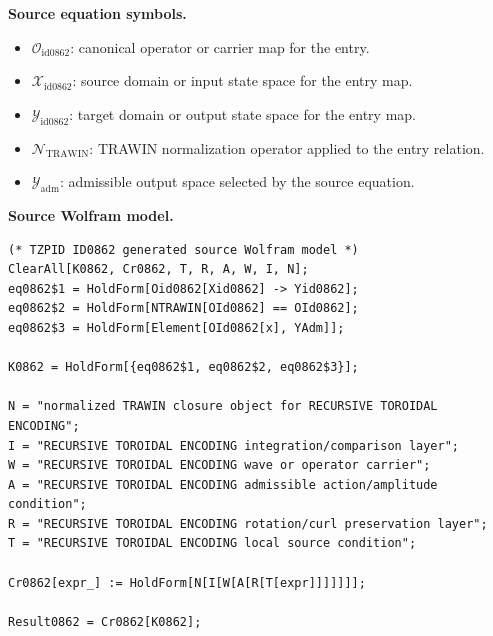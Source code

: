 \begin{minipage}[t]{0.49\linewidth}
\begingroup
\small
\raggedright
\textbf{Source equation symbols.}\par
\begin{itemize}[leftmargin=1.35em,itemsep=1pt,topsep=1pt,parsep=0pt]
    \item $\mathcal{O}_{\mathrm{id0862}}$: canonical operator or carrier map for the entry.
    \item $\mathcal{X}_{\mathrm{id0862}}$: source domain or input state space for the entry map.
    \item $\mathcal{Y}_{\mathrm{id0862}}$: target domain or output state space for the entry map.
    \item $\mathcal{N}_{\mathrm{TRAWIN}}$: TRAWIN normalization operator applied to the entry relation.
    \item $\mathcal{Y}_{\mathrm{adm}}$: admissible output space selected by the source equation.
\end{itemize}
\endgroup
\end{minipage}\hfill
\begin{minipage}[t]{0.47\linewidth}
\begingroup
\scriptsize
\raggedright
\textbf{Source Wolfram model.}\par
\begin{Verbatim}[fontsize=\tiny,breaklines=true,breakanywhere=true]
(* TZPID ID0862 generated source Wolfram model *)
ClearAll[K0862, Cr0862, T, R, A, W, I, N];
eq0862$1 = HoldForm[Oid0862[Xid0862] -> Yid0862];
eq0862$2 = HoldForm[NTRAWIN[OId0862] == OId0862];
eq0862$3 = HoldForm[Element[OId0862[x], YAdm]];

K0862 = HoldForm[{eq0862$1, eq0862$2, eq0862$3}];

N = "normalized TRAWIN closure object for RECURSIVE TOROIDAL ENCODING";
I = "RECURSIVE TOROIDAL ENCODING integration/comparison layer";
W = "RECURSIVE TOROIDAL ENCODING wave or operator carrier";
A = "RECURSIVE TOROIDAL ENCODING admissible action/amplitude condition";
R = "RECURSIVE TOROIDAL ENCODING rotation/curl preservation layer";
T = "RECURSIVE TOROIDAL ENCODING local source condition";

Cr0862[expr_] := HoldForm[N[I[W[A[R[T[expr]]]]]]];

Result0862 = Cr0862[K0862];
\end{Verbatim}
\endgroup
\end{minipage}


